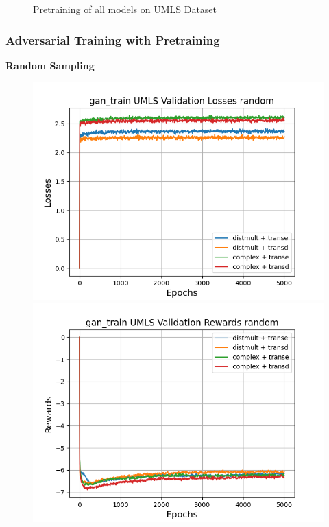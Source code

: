 \begin{figure}
\begin{minipage}{.3\textwidth}
    \end{minipage}%
    \caption{Pretraining of all models on UMLS Dataset}
    \label{fig:test}
\end{figure}

\pagebreak

\subsubsection{Adversarial Training with Pretraining}

\textbf{Random Sampling}\\
\begin{figure}
    \centering
    \begin{minipage}{.5\textwidth}
      \centering
      \includegraphics[width=0.9\linewidth]{figures/results/gan_train/pretrained/random/umls/gan_train_random_umls_losses.png}
    \end{minipage}%
    \begin{minipage}{.5\textwidth}
      \centering
      \includegraphics[width=0.9\linewidth]{figures/results/gan_train/pretrained/random/umls/gan_train_random_umls_rewards.png}

\end{minipage}
\end{figure}
